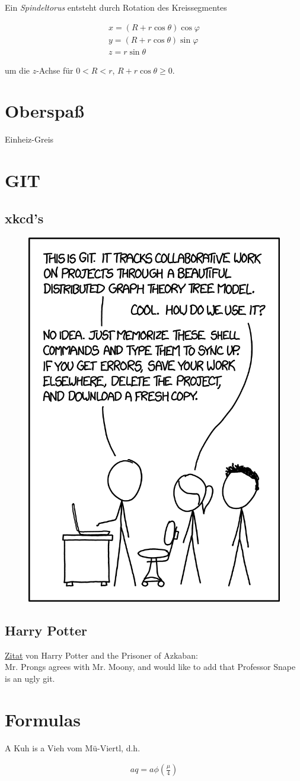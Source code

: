 \documentclass{article}
\begin{document}
Ein \textit{Spindeltorus} entsteht durch Rotation des Kreissegmentes

\begin{align*}
  x = (R + r \cos{\theta}) \cos{\varphi} \\
  y = (R + r \cos{\theta}) \sin{\varphi} \\
  z = r \sin{\theta}
\end{align*}

um die $z$-Achse für $0 < R < r$, $R + r \cos{\theta} \geq 0$.

\section{Oberspaß}
\glqq Einheiz-Greis\grqq

\section{GIT}

\subsection{xkcd's}

\begin{figure}[h!]
  \centering
  \includegraphics[width = 0.5 \linewidth]{images/git_2x.png}
\end{figure}

\subsection{Harry Potter}

\href{https://www.hp-lexicon.org/quote/professor-snape-ugly-git/}{Zitat} von \glqq Harry Potter and the Prisoner of Azkaban\grqq:\\

\glqq Mr. Prongs agrees with Mr. Moony, and would like to add that Professor Snape is an ugly git.\grqq

\section{Formulas}

\glqq A Kuh is a Vieh vom Mü-Viertl\grqq, d.h.

\begin{align}
  aq = a \phi \left( \frac{\mu}{4} \right)
\end{align}
\end{document}
